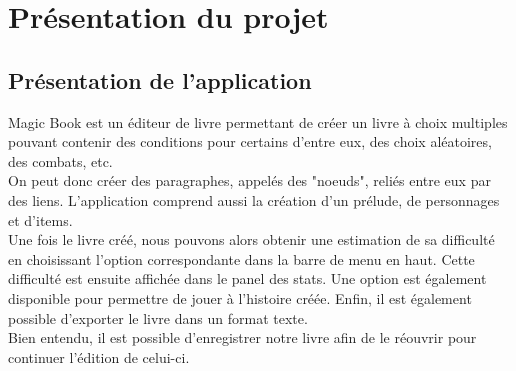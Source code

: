 \chapter{Présentation du projet}

	\section{Présentation de l'application}
        Magic Book est un éditeur de livre permettant de créer un livre à choix multiples pouvant contenir des conditions pour certains d'entre eux, des choix aléatoires, des combats, etc.\\
        On peut donc créer des paragraphes, appelés des "noeuds", reliés entre eux par des liens. L'application comprend aussi la création d'un prélude, de personnages et d'items.\\
        Une fois le livre créé, nous pouvons alors obtenir une estimation de sa difficulté en choisissant l'option correspondante dans la barre de menu en haut. Cette difficulté est ensuite affichée dans le panel des stats. Une option est également disponible pour permettre de jouer à l'histoire créée. Enfin, il est également possible d'exporter le livre dans un format texte.\\
        Bien entendu, il est possible d'enregistrer notre livre afin de le réouvrir pour continuer l'édition de celui-ci.\\
